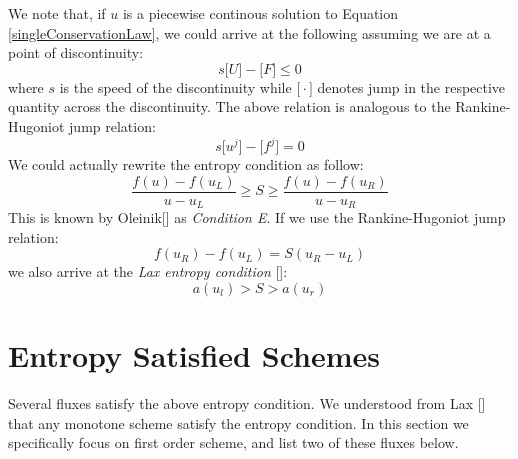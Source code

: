 \documentclass[a4paper]{article}
\numberwithin{equation}{section}
\begin{document}
We note that, if $u$ is a piecewise continous solution to Equation \ref{singleConservationLaw}, we could arrive at the following assuming we are at a point of discontinuity:
\begin{equation}
    s \big[U\big] - \big[F\big] \leq 0
\end{equation}
where $s$ is the speed of the discontinuity while $\big[\cdot\big]$ denotes jump in the respective quantity across the discontinuity. The above relation is analogous to the Rankine-Hugoniot jump relation:
\begin{equation}
    s \big[u^j\big] - \big[f^j\big] = 0
\end{equation}
We could actually rewrite the entropy condition as follow:
\begin{equation}
    \frac{f(u) - f(u_L)}{u-u_L} \geq S \geq \frac{f(u) - f(u_R)}{u-u_R}
\end{equation}
This is known by Oleinik[] as \textit{Condition E}. If we use the Rankine-Hugoniot jump relation:
\begin{equation}
    f(u_R) - f(u_L) = S(u_R - u_L)
\end{equation}
we also arrive at the \textit{Lax entropy condition} []:
\begin{equation}
    a(u_l) > S > a(u_r)
\end{equation}

\section{Entropy Satisfied Schemes}
Several fluxes satisfy the above entropy condition. We understood from Lax [] that any monotone scheme satisfy the entropy condition. In this section we specifically focus on first order scheme, and list two of these fluxes below.
\end{document}
